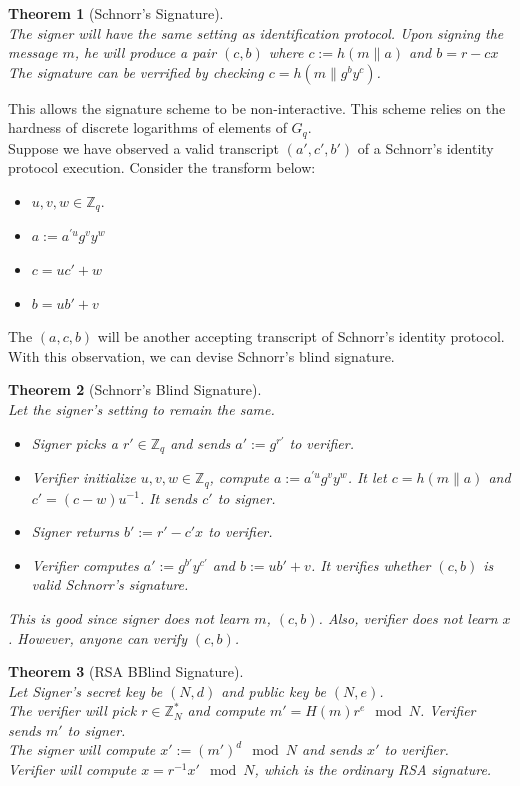 \documentclass[12pt]{article}
\newtheorem{theorem}{Theorem}[section]
\theoremstyle{definition}
\begin{document}
\begin{theorem}[Schnorr's Signature]
\hfill\\\normalfont The signer will have the same setting as identification protocol. Upon signing the message $m$, he will produce a pair $(c,b)$ where
$
c:=h(m\| a)
$
and 
$
b=r-cx
$
The signature can be verrified by checking $c=h(m\| g^b y^c)$.
\end{theorem}
This allows the signature scheme to be non-interactive. This scheme relies on the hardness of discrete logarithms of elements of $G_q$.\\
Suppose we have observed a valid transcript $(a',c',b')$ of a Schnorr's identity protocol execution. Consider the transform below:
\begin{itemize}
  \item $u,v,w\in\mathbb{Z}_q$.
  \item $a:=a^{\prime u}g^vy^w$
  \item $c=uc'+w$
  \item $b=ub'+v$
\end{itemize}
The $(a,c,b)$ will be another accepting transcript of Schnorr's identity protocol. With this observation, we can devise Schnorr's blind signature.
\begin{theorem}[Schnorr's Blind Signature]
\hfill\\\normalfont Let the signer's setting to remain the same.
\begin{itemize}
  \item Signer picks a $r'\in\mathbb{Z}_q$ and sends $a':=g^{r'}$ to verifier.
  \item Verifier initialize $u,v,w\in\mathbb{Z}_q$, compute $a:=a^{\prime u}g^v y^w$. It let $c=h(m\| a)$ and $c'=(c-w)u^{-1}$. It sends $c'$ to signer.
  \item Signer returns $b':=r'-c'x$ to verifier.
  \item Verifier computes $a':=g^{b'}y^{c'}$ and $b:=ub'+v$. It verifies whether $(c,b)$ is valid Schnorr's signature.
\end{itemize}
This is good since signer does not learn $m$, $(c,b)$. Also, verifier does not learn $x$. However, anyone can verify $(c,b)$.
\end{theorem}
\begin{theorem}[RSA BBlind Signature]
\hfill\\\normalfont Let Signer's secret key be $(N,d)$ and public key be $(N,e)$.\\
The verifier will pick $r\in\mathbb{Z}_N^\ast$ and compute $m'=H(m)r^e\mod N$. Verifier sends $m'$ to signer.\\
The signer will compute $x':=(m')^d\mod N$ and sends $x'$ to verifier.\\
Verifier will compute $x=r^{-1}x'\mod N$, which is the ordinary RSA signature.
\end{theorem}
\end{document}
